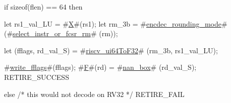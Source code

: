 if   sizeof(flen) == 64
then {
  let rs1_val_LU = #\hyperref[sailRISCVzX]{X}#(rs1);
  let rm_3b      = #\hyperref[sailRISCVzencdeczyroundingzymode]{encdec\_rounding\_mode}# (#\hyperref[sailRISCVzselectzyinstrzyorzyfcsrzyrm]{select\_instr\_or\_fcsr\_rm}#  (rm));

  let (fflags, rd_val_S) = #\hyperref[sailRISCVzriscvzyui64ToF32]{riscv\_ui64ToF32}# (rm_3b, rs1_val_LU);

  #\hyperref[sailRISCVzwritezyfflags]{write\_fflags}#(fflags);
  #\hyperref[sailRISCVzF]{F}#(rd) = #\hyperref[sailRISCVznanzybox]{nan\_box}# (rd_val_S);
  RETIRE_SUCCESS
} else {
  /* this would not decode on RV32 */
  RETIRE_FAIL
}
